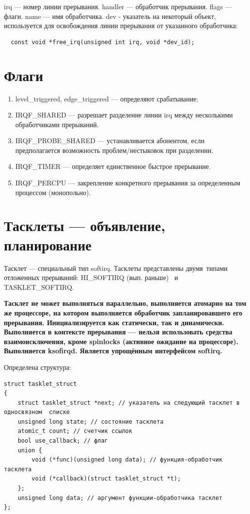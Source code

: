 irq --- номер линии прерывания. handler --- обработчик прерывания. flags --- флаги. name --- имя обработчика. dev - указатель на некоторый объект, используется для освобождения линии прерывания от указанного обработчика:

\begin{lstlisting}
  const void *free_irq(unsigned int irq, void *dev_id);
\end{lstlisting}

\section{Флаги}
\begin{enumerate}
        \item level\_triggered, edge\_triggered --- определяют срабатывание;           
  \item IRQF\_SHARED --- разрешает разделение линии irq между несколькими обработчиками прерываний.
  \item IRQF\_PROBE\_SHARED --- устанавливается абонентом, если предполагается возможность проблем/нестыковок при разделении.
  \item IRQF\_TIMER --- определяет единственное быстрое прерывание.
  \item IRQF\_PERCPU --- закрепление конкретного прерывания за определенным процессом (монопольно).
\end{enumerate}

\section{Тасклеты --- объявление, планирование}

Тасклет --- специальный тип softirq. Тасклеты представлены двумя типами отложенных прерываний: HI\_SOFTIRQ (вып. раньше)  и TASKLET\_SOFTIRQ.

\textbf{Тасклет не может выполняться параллельно, выполняется атомарно на том же процессоре, на котором выполняется обработчик запланировавшего его прерывания. Инициализируется как статически, так и динамически. Выполняется в контексте прерывания --- нельзя использовать средства взаимоисключения, кроме spinlocks (активное ожидание на процессоре). Выполняется ksofirqd. Является упрощённым интерфейсом softirq.}

Определена структура:

\begin{lstlisting}
struct tasklet_struct
{
	struct tasklet_struct *next; // указатель на следующий тасклет в односвязном  списке
	unsigned long state; // состояние тасклета
	atomic_t count; // счетчик ссылок 
	bool use_callback; // флаг
	union {
		void (*func)(unsigned long data); // функция-обработчик тасклета
		void (*callback)(struct tasklet_struct *t);
	};
	unsigned long data; // аргумент функции-обработчика тасклет
};
\end{lstlisting}

